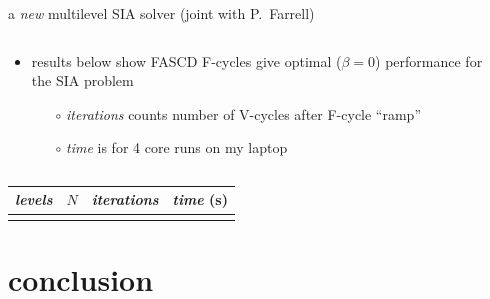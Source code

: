 \documentclass[svgnames,
               hyperref={colorlinks,citecolor=DeepPink4,linkcolor=FireBrick,urlcolor=Maroon},
               usepdftitle=false]  %
               {beamer}
\begin{document}
\begin{frame}{a \emph{new} multilevel SIA solver (joint with P.~Farrell)}

\begin{columns}
\begin{column}{0.6\textwidth}
\begin{itemize}
\item results below show FASCD F-cycles give optimal ($\beta=0$) performance for the SIA problem
    \begin{itemize}
    \item[$\circ$] \emph{iterations} counts number of V-cycles after F-cycle ``ramp''
    \item[$\circ$] \emph{time} is for 4 core runs on my laptop
    \end{itemize}
\end{itemize}
\end{column}
\begin{column}{0.4\textwidth}
\hfill 
\end{column}
\end{columns}

\bigskip
\begin{center}
\begin{tabular}{c|r|c|r}
\emph{levels} & $N$ & \emph{iterations} & \emph{time} (s) \\ \hline
 \hspace{-2.2mm}
\end{tabular}
\end{center}
\end{frame}


\section{conclusion}
\end{document}
